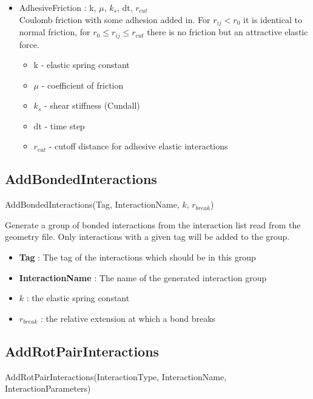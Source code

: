 \documentclass{report}
\begin{document}
\begin{itemize}
\begin{itemize}
\item AdhesiveFriction : k, $\mu$, $k_s$, dt, $r_{cut}$ \\
Coulomb friction with some adhesion added in. For $r_{ij} < r_0$ it is identical to normal friction, for $r_0 \le r_{ij} \le r_{cut}$ there is no friction but an attractive elastic force.
\begin{itemize}
\item k - elastic spring constant
\item $\mu$ - coefficient of friction
\item $k_s$ - shear stiffness (Cundall)
\item dt - time step
\item $r_{cut}$ - cutoff distance for adhesive elastic interactions 
\end{itemize} 

\end{itemize}
\end{itemize}

\subsection{AddBondedInteractions}

\textsf{AddBondedInteractions(Tag, InteractionName, $k$, $r_{break}$)}
\par \medskip
Generate a group of bonded interactions from the interaction list read from the geometry file. Only interactions with a given tag will be added to the group.
\begin{itemize}
\item \textbf{Tag} : The tag of the interactions which should be in this group 
\item \textbf{InteractionName} : The name of the generated interaction group
\item \textbf{$k$} : the elastic spring constant
\item \textbf{$r_{break}$} : the relative extension at which a bond breaks  
\end{itemize} 

\subsection{AddRotPairInteractions}

\textsf{AddRotPairInteractions(InteractionType, InteractionName, InteractionParameters)}
\par \medskip
\end{document}
